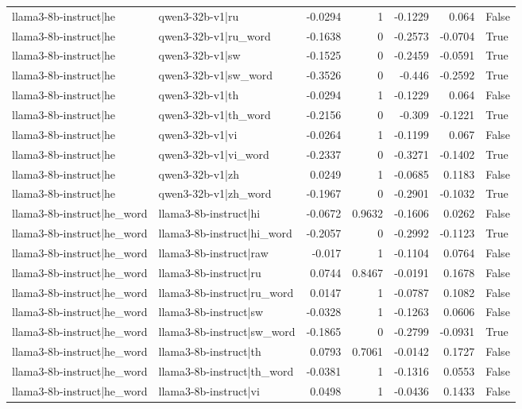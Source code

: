 \begin{table}
\begin{tabular}{l l r r r r l}
llama3-8b-instruct|he & qwen3-32b-v1|ru & -0.0294 & 1 & -0.1229 & 0.064 & False \\
llama3-8b-instruct|he & qwen3-32b-v1|ru_word & -0.1638 & 0 & -0.2573 & -0.0704 & True \\
llama3-8b-instruct|he & qwen3-32b-v1|sw & -0.1525 & 0 & -0.2459 & -0.0591 & True \\
llama3-8b-instruct|he & qwen3-32b-v1|sw_word & -0.3526 & 0 & -0.446 & -0.2592 & True \\
llama3-8b-instruct|he & qwen3-32b-v1|th & -0.0294 & 1 & -0.1229 & 0.064 & False \\
llama3-8b-instruct|he & qwen3-32b-v1|th_word & -0.2156 & 0 & -0.309 & -0.1221 & True \\
llama3-8b-instruct|he & qwen3-32b-v1|vi & -0.0264 & 1 & -0.1199 & 0.067 & False \\
llama3-8b-instruct|he & qwen3-32b-v1|vi_word & -0.2337 & 0 & -0.3271 & -0.1402 & True \\
llama3-8b-instruct|he & qwen3-32b-v1|zh & 0.0249 & 1 & -0.0685 & 0.1183 & False \\
llama3-8b-instruct|he & qwen3-32b-v1|zh_word & -0.1967 & 0 & -0.2901 & -0.1032 & True \\
llama3-8b-instruct|he_word & llama3-8b-instruct|hi & -0.0672 & 0.9632 & -0.1606 & 0.0262 & False \\
llama3-8b-instruct|he_word & llama3-8b-instruct|hi_word & -0.2057 & 0 & -0.2992 & -0.1123 & True \\
llama3-8b-instruct|he_word & llama3-8b-instruct|raw & -0.017 & 1 & -0.1104 & 0.0764 & False \\
llama3-8b-instruct|he_word & llama3-8b-instruct|ru & 0.0744 & 0.8467 & -0.0191 & 0.1678 & False \\
llama3-8b-instruct|he_word & llama3-8b-instruct|ru_word & 0.0147 & 1 & -0.0787 & 0.1082 & False \\
llama3-8b-instruct|he_word & llama3-8b-instruct|sw & -0.0328 & 1 & -0.1263 & 0.0606 & False \\
llama3-8b-instruct|he_word & llama3-8b-instruct|sw_word & -0.1865 & 0 & -0.2799 & -0.0931 & True \\
llama3-8b-instruct|he_word & llama3-8b-instruct|th & 0.0793 & 0.7061 & -0.0142 & 0.1727 & False \\
llama3-8b-instruct|he_word & llama3-8b-instruct|th_word & -0.0381 & 1 & -0.1316 & 0.0553 & False \\
llama3-8b-instruct|he_word & llama3-8b-instruct|vi & 0.0498 & 1 & -0.0436 & 0.1433 & False \\

\end{tabular}
\end{table}
